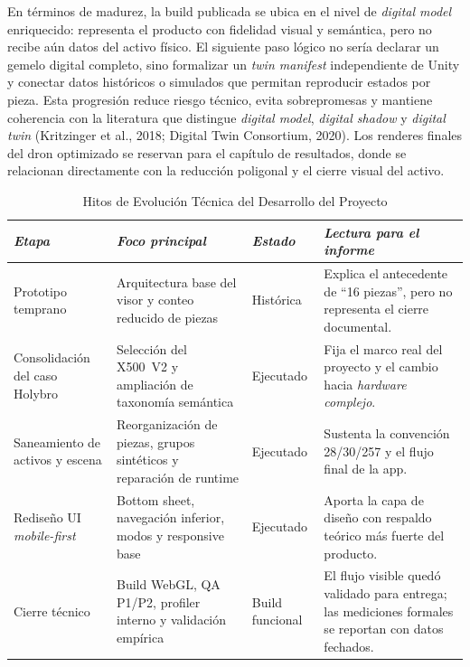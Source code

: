 En términos de madurez, la build publicada se ubica en el nivel de \textit{digital model} enriquecido: representa el producto con fidelidad visual y semántica, pero no recibe aún datos del activo físico. El siguiente paso lógico no sería declarar un gemelo digital completo, sino formalizar un \textit{twin manifest} independiente de Unity y conectar datos históricos o simulados que permitan reproducir estados por pieza. Esta progresión reduce riesgo técnico, evita sobrepromesas y mantiene coherencia con la literatura que distingue \textit{digital model}, \textit{digital shadow} y \textit{digital twin} (Kritzinger et al., 2018; Digital Twin Consortium, 2020). Los renderes finales del dron optimizado se reservan para el capítulo de resultados, donde se relacionan directamente con la reducción poligonal y el cierre visual del activo.

\begin{table}[htbp]
    \caption{Hitos de Evolución Técnica del Desarrollo del Proyecto}
    \label{tab:hitos_desarrollo_proyecto}
    \begin{tabularx}{\textwidth}{p{2.6cm}p{4.0cm}p{2.4cm}X}
        \hline
        \textit{Etapa} & \textit{Foco principal} & \textit{Estado} & \textit{Lectura para el informe} \\ \hline
        Prototipo temprano & Arquitectura base del visor y conteo reducido de piezas & Histórica & Explica el antecedente de ``16 piezas'', pero no representa el cierre documental. \\
        Consolidación del caso Holybro & Selección del X500~V2 y ampliación de taxonomía semántica & Ejecutado & Fija el marco real del proyecto y el cambio hacia \textit{hardware complejo}. \\
        Saneamiento de activos y escena & Reorganización de piezas, grupos sintéticos y reparación de runtime & Ejecutado & Sustenta la convención 28/30/257 y el flujo final de la app. \\
        Rediseño UI \textit{mobile-first} & Bottom sheet, navegación inferior, modos y responsive base & Ejecutado & Aporta la capa de diseño con respaldo teórico más fuerte del producto. \\
        Cierre técnico & Build WebGL, QA P1/P2, profiler interno y validación empírica & Build funcional & El flujo visible quedó validado para entrega; las mediciones formales se reportan con datos fechados. \\ \hline
    \end{tabularx}
\end{table}

